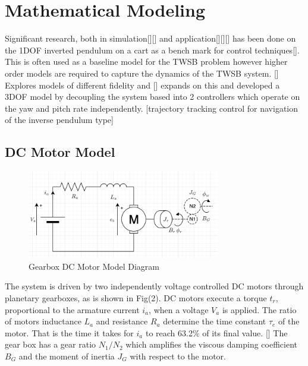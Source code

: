  \section{Mathematical Modeling} %
    Significant research, both in simulation[][] and 
    application[][][] has been done on the 1DOF inverted pendulum
    on a cart as a bench mark for control techniques[]. This is often used as a baseline model for the TWSB problem
    however higher order models are required to capture the dynamics of the TWSB system. [] Explores models of different fidelity 
    and [] expands on this and developed a 3DOF model by decoupling the system based into 2 controllers which 
    operate on the yaw and pitch rate independently. [trajectory tracking control for navigation of the inverse pendulum type] 
    \pagebreak{}
    \subsection{DC Motor Model}    
    \begin{figure}[H]
        \centering
            \includegraphics[width=0.75\textwidth]{DCMotorModel.png}
        \caption{Gearbox DC Motor Model Diagram}
    \end{figure}
    The system is driven by two independently voltage controlled DC motors through planetary gearboxes, 
    as is shown in Fig(2). 
    DC motors execute a torque $t_r$, proportional to the armature current $i_a$, when a voltage $V_a$ is applied.
    The ratio of motors inductance $L_a$ and resistance $R_a$ determine the time constant $\tau_e$ of the motor. 
    That is the time it takes for $i_a$ to reach 63.2\% of its final value. []
    The gear box has a gear ratio $N_1/N_2$ which amplifies the viscous damping coefficient $B_G$ and the moment of inertia $J_G$  with respect to the motor.

